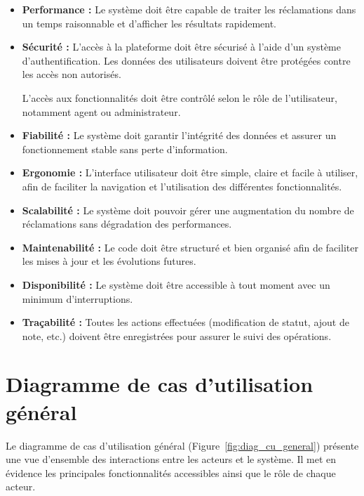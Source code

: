 \documentclass[12pt,a4paper,oneside]{report}
\begin{document}
\begin{itemize}

\item \textbf{Performance :}  
Le système doit être capable de traiter les réclamations dans un temps raisonnable et d’afficher les résultats rapidement.

\item \textbf{Sécurité :}  
L’accès à la plateforme doit être sécurisé à l’aide d’un système d’authentification. Les données des utilisateurs doivent être protégées contre les accès non autorisés.

\noindent L’accès aux fonctionnalités doit être contrôlé selon le rôle de l’utilisateur, notamment agent ou administrateur.

\item \textbf{Fiabilité :}  
Le système doit garantir l’intégrité des données et assurer un fonctionnement stable sans perte d’information.

\item \textbf{Ergonomie :}  
L’interface utilisateur doit être simple, claire et facile à utiliser, afin de faciliter la navigation et l’utilisation des différentes fonctionnalités.

\item \textbf{Scalabilité :}  
Le système doit pouvoir gérer une augmentation du nombre de réclamations sans dégradation des performances.

\item \textbf{Maintenabilité :}  
Le code doit être structuré et bien organisé afin de faciliter les mises à jour et les évolutions futures.

\item \textbf{Disponibilité :}  
Le système doit être accessible à tout moment avec un minimum d’interruptions.

\item \textbf{Traçabilité :}  
Toutes les actions effectuées (modification de statut, ajout de note, etc.) doivent être enregistrées pour assurer le suivi des opérations.

\end{itemize}

\section{Diagramme de cas d’utilisation général}

Le diagramme de cas d’utilisation général (Figure~\ref{fig:diag_cu_general}) présente une vue d’ensemble des interactions entre les acteurs et le système. Il met en évidence les principales fonctionnalités accessibles ainsi que le rôle de chaque acteur.
\end{document}
